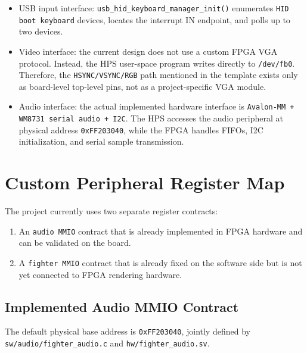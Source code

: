 \documentclass[12pt,a4paper]{article}
\begin{document}
\begin{itemize}
  \item USB input interface: \texttt{usb\_hid\_keyboard\_manager\_init()} enumerates \texttt{HID boot keyboard} devices, locates the interrupt IN endpoint, and polls up to two devices.
  \item Video interface: the current design does not use a custom FPGA VGA protocol. Instead, the HPS user-space program writes directly to \texttt{/dev/fb0}. Therefore, the \texttt{HSYNC/VSYNC/RGB} path mentioned in the template exists only as board-level top-level pins, not as a project-specific VGA module.
  \item Audio interface: the actual implemented hardware interface is \texttt{Avalon-MM + WM8731 serial audio + I2C}. The HPS accesses the audio peripheral at physical address \texttt{0xFF203040}, while the FPGA handles FIFOs, I2C initialization, and serial sample transmission.
\end{itemize}

\section{Custom Peripheral Register Map}

The project currently uses two separate register contracts:

\begin{enumerate}
  \item An \texttt{audio MMIO} contract that is already implemented in FPGA hardware and can be validated on the board.
  \item A \texttt{fighter MMIO} contract that is already fixed on the software side but is not yet connected to FPGA rendering hardware.
\end{enumerate}

\subsection{Implemented Audio MMIO Contract}

The default physical base address is \texttt{0xFF203040}, jointly defined by \texttt{sw/audio/fighter\_audio.c} and \texttt{hw/fighter\_audio.sv}.
\end{document}
